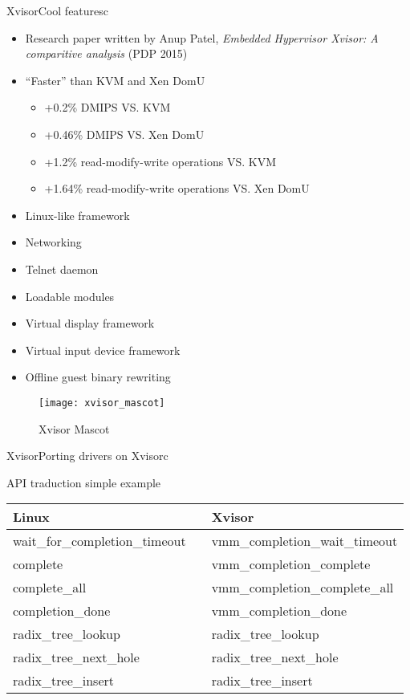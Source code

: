 \documentclass[english,slidetop,9pt,aspectratio=169]{beamer}
\begin{document}
  \begin{myframe}[0]{Xvisor}{Cool features}{c}
    \begin{minipage}{0.54\textwidth}
      \begin{itemize}
      \item Research paper written by Anup Patel, \textit{Embedded Hypervisor
        Xvisor: A comparitive analysis} (PDP 2015)
      \item ``Faster'' than KVM and Xen DomU
        \begin{itemize}
        \item +0.2\% DMIPS VS. KVM
        \item +0.46\% DMIPS VS. Xen DomU
        \item +1.2\% read-modify-write operations VS. KVM
        \item +1.64\% read-modify-write operations VS. Xen DomU
        \end{itemize}
      \item Linux-like framework
      \item Networking
      \item Telnet daemon
      \item Loadable modules
      \item Virtual display framework
      \item Virtual input device framework
      \item Offline guest binary rewriting
      \end{itemize}
    \end{minipage}
    \begin{minipage}{0.45\textwidth}
      \begin{figure}[h!]
        \centering
        \texttt{[image: xvisor\_mascot]}
        \caption{Xvisor Mascot}
      \end{figure}
    \end{minipage}
  \end{myframe}

  \begin{myframe}{Xvisor}{Porting drivers on Xvisor}{c}
    \begin{nbox}{API traduction simple example}
      \begin{tabular}[t]{C{.4\textwidth}C{.1\textwidth}C{.4\textwidth}}
        Linux & & Xvisor \\
        \hline
        wait\_for\_completion\_timeout &  & vmm\_completion\_wait\_timeout \\
        complete & & vmm\_completion\_complete \\
        complete\_all & & vmm\_completion\_complete\_all \\
        completion\_done & & vmm\_completion\_done \\
        radix\_tree\_lookup & & radix\_tree\_lookup \\
        radix\_tree\_next\_hole & & radix\_tree\_next\_hole \\
        radix\_tree\_insert & & radix\_tree\_insert
      \end{tabular}
    \end{nbox}
  \end{myframe}
\end{document}
